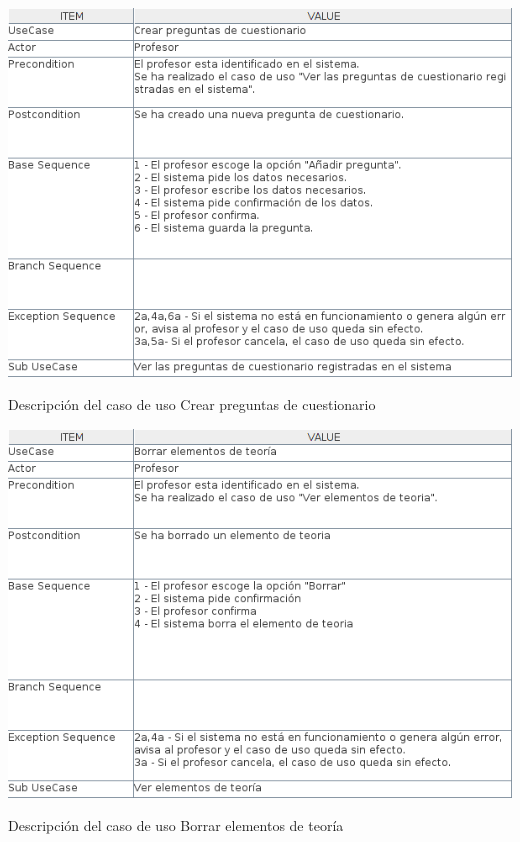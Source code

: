 \documentclass[openright,twoside,10pt]{book}
\begin{document}
    \vspace*{\fill}
    
    \newpage
    
    \vspace*{\fill}
    
    \begin{table}[H]
        \begin{center}
            \includegraphics[width=\textwidth]{img/astah/analisis/casos_de_uso/useCase13.png}
        \end{center}
        \caption{Descripción del caso de uso Crear preguntas de cuestionario}
    \end{table}
    
    \vspace*{\fill}
    
    \newpage
    
    \vspace*{\fill}
    
    \begin{table}[H]
        \begin{center}
            \includegraphics[width=\textwidth]{img/astah/analisis/casos_de_uso/useCase14.png}
        \end{center}
        \caption{Descripción del caso de uso Borrar elementos de teoría}
    \end{table}
    
\end{document}
